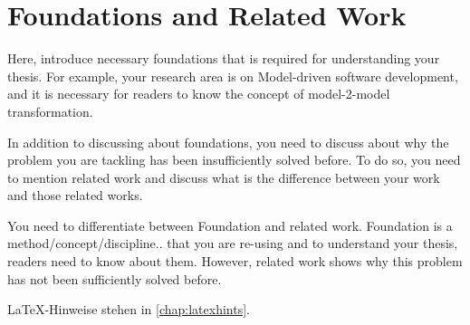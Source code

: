 
\chapter{Foundations and Related Work}
\label{chap:ch2}

Here, introduce necessary foundations that is required for understanding your thesis. For example, your research area is on Model-driven software development, and it is necessary for readers to know the concept of model-2-model transformation.

In addition to discussing about foundations, you need to discuss about why the problem you are tackling has been insufficiently solved before. To do so, you need to mention related work and discuss what is the difference between your work and those related works.

You need to differentiate between Foundation and related work. Foundation is a method/concept/discipline.. that you are re-using and to understand your thesis, readers need to know about them. However, related work shows why this problem has not been sufficiently solved before.

LaTeX-Hinweise stehen in \cref{chap:latexhints}.

